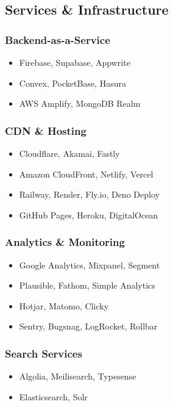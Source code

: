 \documentclass[11pt,a4paper,oneside]{article}
\begin{document}
\subsection{Services \& Infrastructure}

\subsubsection{Backend-as-a-Service}
\begin{itemize}
    \item Firebase, Supabase, Appwrite
    \item Convex, PocketBase, Hasura
    \item AWS Amplify, MongoDB Realm
\end{itemize}

\subsubsection{CDN \& Hosting}
\begin{itemize}
    \item Cloudflare, Akamai, Fastly
    \item Amazon CloudFront, Netlify, Vercel
    \item Railway, Render, Fly.io, Deno Deploy
    \item GitHub Pages, Heroku, DigitalOcean
\end{itemize}

\subsubsection{Analytics \& Monitoring}
\begin{itemize}
    \item Google Analytics, Mixpanel, Segment
    \item Plausible, Fathom, Simple Analytics
    \item Hotjar, Matomo, Clicky
    \item Sentry, Bugsnag, LogRocket, Rollbar
\end{itemize}

\subsubsection{Search Services}
\begin{itemize}
    \item Algolia, Meilisearch, Typesense
    \item Elasticsearch, Solr
\end{itemize}
\end{document}
